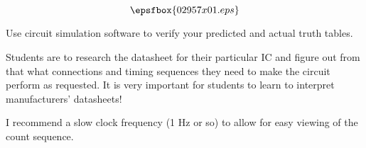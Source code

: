

$$\epsfbox{02957x01.eps}$$

\vfil \eject






Use circuit simulation software to verify your predicted and actual truth tables.







Students are to research the datasheet for their particular IC and figure out from that what connections and timing sequences they need to make the circuit perform as requested.  It is very important for students to learn to interpret manufacturers' datasheets!

I recommend a slow clock frequency (1 Hz or so) to allow for easy viewing of the count sequence.




